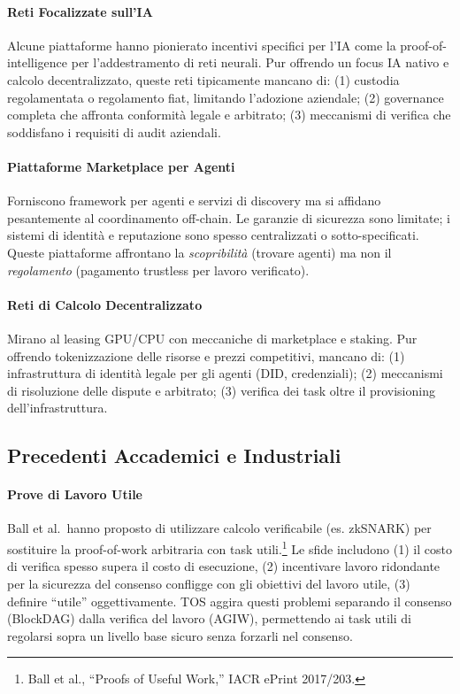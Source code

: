 \documentclass[11pt]{article}
\begin{document}
\paragraph{Reti Focalizzate sull'IA} Alcune piattaforme hanno pionierato incentivi specifici per l'IA come la proof-of-intelligence per l'addestramento di reti neurali. Pur offrendo un focus IA nativo e calcolo decentralizzato, queste reti tipicamente mancano di: (1) custodia regolamentata o regolamento fiat, limitando l'adozione aziendale; (2) governance completa che affronta conformità legale e arbitrato; (3) meccanismi di verifica che soddisfano i requisiti di audit aziendali.

\paragraph{Piattaforme Marketplace per Agenti} Forniscono framework per agenti e servizi di discovery ma si affidano pesantemente al coordinamento off-chain. Le garanzie di sicurezza sono limitate; i sistemi di identità e reputazione sono spesso centralizzati o sotto-specificati. Queste piattaforme affrontano la \emph{scopribilità} (trovare agenti) ma non il \emph{regolamento} (pagamento trustless per lavoro verificato).

\paragraph{Reti di Calcolo Decentralizzato} Mirano al leasing GPU/CPU con meccaniche di marketplace e staking. Pur offrendo tokenizzazione delle risorse e prezzi competitivi, mancano di: (1) infrastruttura di identità legale per gli agenti (DID, credenziali); (2) meccanismi di risoluzione delle dispute e arbitrato; (3) verifica dei task oltre il provisioning dell'infrastruttura.

\subsection{Precedenti Accademici e Industriali}
\paragraph{Prove di Lavoro Utile} Ball et al.\ hanno proposto di utilizzare calcolo verificabile (es. zkSNARK) per sostituire la proof-of-work arbitraria con task utili.\footnote{Ball et al., ``Proofs of Useful Work,'' IACR ePrint 2017/203.} Le sfide includono (1) il costo di verifica spesso supera il costo di esecuzione, (2) incentivare lavoro ridondante per la sicurezza del consenso confligge con gli obiettivi del lavoro utile, (3) definire ``utile'' oggettivamente. TOS aggira questi problemi separando il consenso (BlockDAG) dalla verifica del lavoro (AGIW), permettendo ai task utili di regolarsi sopra un livello base sicuro senza forzarli nel consenso.
\end{document}

